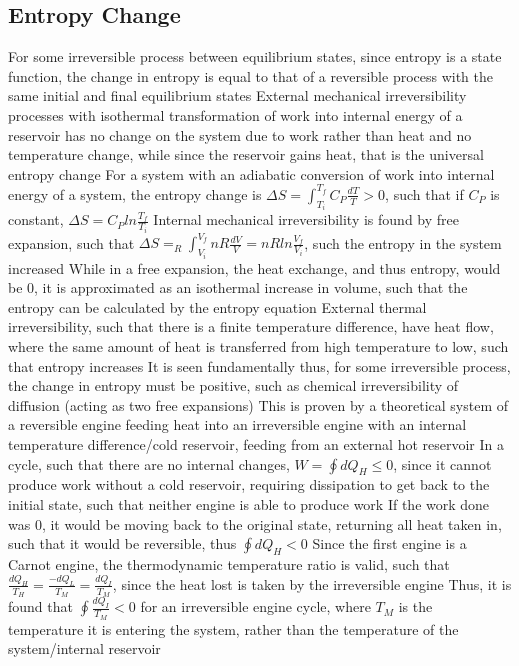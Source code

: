 \documentclass[11 pt, twoside]{article}
\newenvironment{outline*}
{
	\begin{outline}[enumerate]
	}
	{\end{outline}
}
\begin{document}
\subsection{Entropy Change}
\begin{outline*}
\1 For some irreversible process between equilibrium states, since entropy is a state function, the change in entropy is equal to that of a reversible process with the same initial and final equilibrium states
\2 External mechanical irreversibility processes with isothermal transformation of work into internal energy of a reservoir has no change on the system due to work rather than heat and no temperature change, while since the reservoir gains heat, that is the universal entropy change
\3 For a system with an adiabatic conversion of work into internal energy of a system, the entropy change is $\Delta S = \int^{T_f}_{T_i} C_P \frac{dT}{T} > 0$, such that if $C_P$ is constant, $\Delta S = C_P ln\frac{T_f}{T_i}$
\2 Internal mechanical irreversibility is found by free expansion, such that $\Delta S = _R\int_{V_i}^{V_f} nR \frac{dV}{V} = nR ln\frac{V_f}{V_i}$, such the entropy in the system increased
\3 While in a free expansion, the heat exchange, and thus entropy, would be 0, it is approximated as an isothermal increase in volume, such that the entropy can be calculated by the entropy equation
\2 External thermal irreversibility, such that there is a finite temperature difference, have heat flow, where the same amount of heat is transferred from high temperature to low, such that entropy increases
\2 It is seen fundamentally thus, for some irreversible process, the change in entropy must be positive, such as chemical irreversibility of diffusion (acting as two free expansions)
\2 This is proven by a theoretical system of a reversible engine feeding heat into an irreversible engine with an internal temperature difference/cold reservoir, feeding from an external hot reservoir
\3 In a cycle, such that there are no internal changes, $W = \oint dQ_{H} \leq 0$, since it cannot produce work without a cold reservoir, requiring dissipation to get back to the initial state, such that neither engine is able to produce work
\3 If the work done was 0, it would be moving back to the original state, returning all heat taken in, such that it would be reversible, thus $\oint dQ_H < 0$
\3 Since the first engine is a Carnot engine, the thermodynamic temperature ratio is valid, such that $\frac{dQ_H}{T_H} = \frac{-dQ_L}{T_M} = \frac{dQ_I}{T_M}$, since the heat lost is taken by the irreversible engine
\3 Thus, it is found that $\oint \frac{dQ_I}{T_M} < 0$ for an irreversible engine cycle, where $T_M$ is the temperature it is entering the system, rather than the temperature of the system/internal reservoir

\end{outline*}
\end{document}
